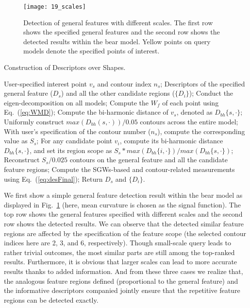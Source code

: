 \begin{figure}[!to]
\texttt{[image: 19\_scales]}
\caption{Detection of general features with different scales. The first
row shows the specified general features and the second row shows the
detected results within the bear model. Yellow points on query models
denote the specified points of interest.}
\label{scales}
\end{figure}


\begin{algorithm}
\caption{Construction of Descriptors over Shapes.}
\label{alg:Framwork}
\begin{algorithmic}[1]
\REQUIRE User-specified interest point $v_{s}$ and contour index $n_{s}$;
\ENSURE  Descriptors of the specified general feature ($D_{s}$) and all
         the other candidate regions ($\{D_{i}\}$);
\STATE Conduct the eigen-decomposition on all models;
\STATE Compute the $W_f$ of each point using Eq.~(\ref{eq:WMD});
\STATE Compute the bi-harmonic distance of $v_{s}$, denoted as $D_{bh}\{s,\cdot\}$;
\STATE Uniformly construct  $max(D_{bh}(s,\cdot))/0.05$ contours across the entire model;
\STATE With user's specification of the contour number ($n_{s}$), compute the corresponding value as $S_{s}$;
\STATE For any candidate point $v_{i}$, compute its bi-harmonic distance $D_{bh}\{s,\cdot\}$,
       and set its region scope as $S_{s}*max(D_{bh}\{i,\cdot\})/max(D_{bh}\{s,\cdot\})$;
\STATE Reconstruct $S_{s}/0.025$ contours on the general feature and all the candidate feature regions;
\STATE Compute the SGWs-based and contour-related measurements using Eq.~(\ref{eq:desFinal});
\STATE Return $D_s$ and $\{D_{i}\}$.
\end{algorithmic}
\end{algorithm}

We first show a simple general feature detection result within the
bear model as displayed in Fig.~\ref{scales} (here, mean curvature is
chosen as the signal function). The top row shows the
general features specified with different scales and the second row
shows the detected results. We can observe that the
detected similar feature regions are affected by the specification
of the feature scope (the selected contour indices here are 2, 3,
and 6, respectively). Though small-scale query leads to rather
trivial outcomes, the most similar parts are still among the
top-ranked results. Furthermore, it is obvious that
larger scales can lead to more accurate results thanks to added
information. And from these three cases we realize that, the
analogous feature regions defined (proportional to the general
feature) and the informative descriptors companied jointly ensure that
the repetitive feature regions can be detected exactly.

